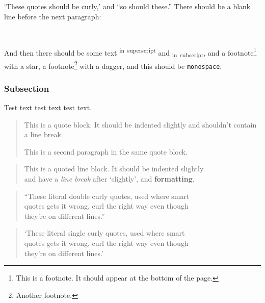 \documentclass[
  12pt,
  a4paper,
]{article}
\begin{document}
\makeatletter
\@afterindentfalse
\@afterheading
\makeatother

`These quotes should be curly,' and ``so should these.'' There should be
a blank line before the next paragraph:

~

\makeatletter
\@afterindentfalse
\@afterheading
\makeatother

And then there should be some text \textsuperscript{in~superscript} and
\textsubscript{in~subscript}, and a footnote\footnote{This is a
  footnote. It should appear at the bottom of the page.} with a star, a
footnote\footnote{Another footnote.} with a dagger, and this should be
\texttt{monospace}.

\hypertarget{__h3_1}{%
\subsubsection{Subsection}\label{__h3_1}}

\makeatletter
\@afterindentfalse
\@afterheading
\makeatother

Test text test text test text.

\begin{quote}
This is a quote block. It should be indented slightly and shouldn't
contain a line break.

This is a second paragraph in the same quote block.
\end{quote}

\begin{quote}
This is a quoted line block. It should be indented slightly\\
and have a \emph{line break} after `slightly', and \textbf{formatting}.
\end{quote}

\begin{quote}
``These literal double curly quotes, used where smart\\
quotes gets it wrong, curl the right way even though\\
they're on different lines.''
\end{quote}

\begin{quote}
`These literal single curly quotes, used where smart\\
quotes gets it wrong, curl the right way even though\\
they're on different lines.'
\end{quote}

\makeatletter
\@afterindentfalse
\@afterheading
\makeatother
\end{document}
